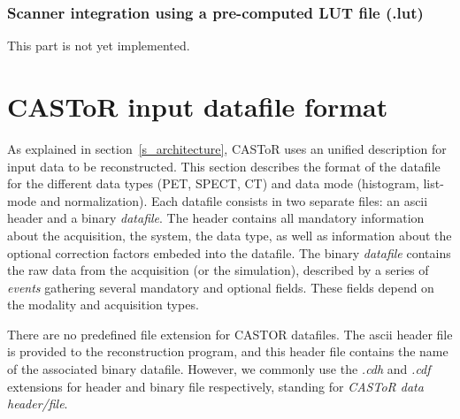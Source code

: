 \documentclass[a4paper, 11pt]{article}
\begin{document}
\subsubsection{Scanner integration using a pre-computed LUT file (.lut)}
\label{sss_scanner_integration_CT_uLUT}

This part is not yet implemented.

\newpage
\section{CASToR input datafile format}
\label{s_input_files}

As explained in section~\ref{s_architecture}, CASToR uses an unified description for input data to be reconstructed. This section describes the format
of the datafile for the different data types (PET, SPECT, CT) and data mode (histogram, list-mode and normalization). Each datafile consists in two
separate files: an ascii header and a binary \textit{datafile}. The header contains all mandatory information about the acquisition, the system, the data
type, as well as information about the optional correction factors embeded into the datafile. The binary \textit{datafile} contains the raw data from the
acquisition (or the simulation), described by a series of \textit{events} gathering several mandatory and optional fields. These fields depend on the
modality and acquisition types.

There are no predefined file extension for CASTOR datafiles. The ascii header file is provided to the reconstruction program, and this header file
contains the name of the associated binary datafile. However, we commonly use the \textit{.cdh} and \textit{.cdf} extensions for header and binary
file respectively, standing for \textit{CASToR data header/file}.
\end{document}
